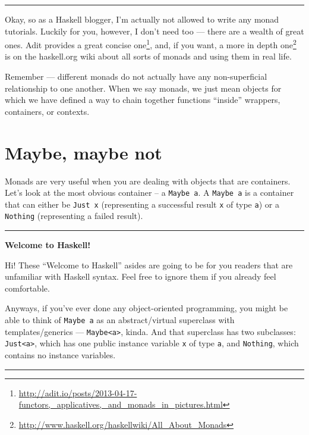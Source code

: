 \documentclass[]{article}
\renewcommand{\href}[2]{#2\footnote{\url{#1}}}
\begin{document}
\begin{center}\rule{0.5\linewidth}{0.5pt}\end{center}

Okay, so as a Haskell blogger, I'm actually not allowed to write any monad
tutorials. Luckily for you, however, I don't need too --- there are a wealth of
great ones.
\href{http://adit.io/posts/2013-04-17-functors,_applicatives,_and_monads_in_pictures.html}{Adit
provides a great concise one}, and, if you want,
\href{http://www.haskell.org/haskellwiki/All_About_Monads}{a more in depth one}
is on the haskell.org wiki about all sorts of monads and using them in real
life.

Remember --- different monads do not actually have any non-superficial
relationship to one another. When we say monads, we just mean objects for which
we have defined a way to chain together functions ``inside'' wrappers,
containers, or contexts.

\section{Maybe, maybe not}\label{maybe-maybe-not}

Monads are very useful when you are dealing with objects that are containers.
Let's look at the most obvious container -- a \texttt{Maybe\ a}. A
\texttt{Maybe\ a} is a container that can either be \texttt{Just\ x}
(representing a successful result \texttt{x} of type \texttt{a}) or a
\texttt{Nothing} (representing a failed result).

\begin{center}\rule{0.5\linewidth}{0.5pt}\end{center}

\textbf{Welcome to Haskell!}

Hi! These ``Welcome to Haskell'' asides are going to be for you readers that are
unfamiliar with Haskell syntax. Feel free to ignore them if you already feel
comfortable.

Anyways, if you've ever done any object-oriented programming, you might be able
to think of \texttt{Maybe\ a} as an abstract/virtual superclass with
templates/generics --- \texttt{Maybe\textless{}a\textgreater{}}, kinda. And that
superclass has two subclasses: \texttt{Just\textless{}a\textgreater{}}, which
has one public instance variable \texttt{x} of type \texttt{a}, and
\texttt{Nothing}, which contains no instance variables.

\begin{center}\rule{0.5\linewidth}{0.5pt}\end{center}
\end{document}
